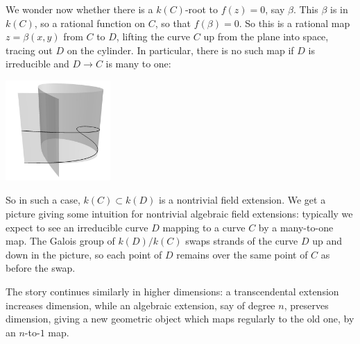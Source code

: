 We wonder now whether there is a \(k(C)\)-root to \(f(z)=0\), say \(\beta\).
This \(\beta\) is in \(k(C)\), so a rational function on \(C\), so that \(f(\beta)=0\).
So this is a rational map \(z=\beta(x,y)\) from \(C\) to \(D\), lifting the curve \(C\) up from the plane into space, tracing out \(D\) on the cylinder.
In particular, there is no such map if \(D\) is irreducible and \(D \to C\) is many to one:
\begin{center}
\includegraphics[width=4cm]{cylinder-on-curve-3}
\end{center}
So in such a case, \(k(C) \subset k(D)\) is a nontrivial field extension.
We get a picture giving some intuition for nontrivial algebraic field extensions: typically we expect to see an irreducible curve \(D\) mapping to a curve \(C\) by a many-to-one map.
The Galois group of \(k(D)/k(C)\) swaps strands of the curve \(D\) up and down in the picture, so each point of \(D\) remains over the same point of \(C\) as before the swap.

The story continues similarly in higher dimensions: a transcendental extension increases dimension, while an algebraic extension, say of degree \(n\), preserves dimension, giving a new geometric object which maps regularly to the old one, by an \(n\)-to-\(1\) map.

   
